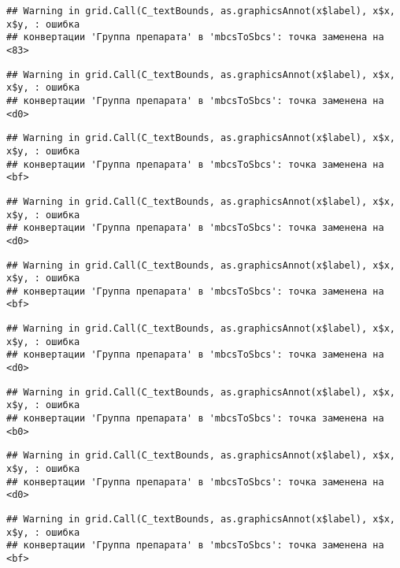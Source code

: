 \documentclass[
]{article}
\begin{document}
\begin{verbatim}
## Warning in grid.Call(C_textBounds, as.graphicsAnnot(x$label), x$x, x$y, : ошибка
## конвертации 'Группа препарата' в 'mbcsToSbcs': точка заменена на <83>
\end{verbatim}

\begin{verbatim}
## Warning in grid.Call(C_textBounds, as.graphicsAnnot(x$label), x$x, x$y, : ошибка
## конвертации 'Группа препарата' в 'mbcsToSbcs': точка заменена на <d0>
\end{verbatim}

\begin{verbatim}
## Warning in grid.Call(C_textBounds, as.graphicsAnnot(x$label), x$x, x$y, : ошибка
## конвертации 'Группа препарата' в 'mbcsToSbcs': точка заменена на <bf>
\end{verbatim}

\begin{verbatim}
## Warning in grid.Call(C_textBounds, as.graphicsAnnot(x$label), x$x, x$y, : ошибка
## конвертации 'Группа препарата' в 'mbcsToSbcs': точка заменена на <d0>
\end{verbatim}

\begin{verbatim}
## Warning in grid.Call(C_textBounds, as.graphicsAnnot(x$label), x$x, x$y, : ошибка
## конвертации 'Группа препарата' в 'mbcsToSbcs': точка заменена на <bf>
\end{verbatim}

\begin{verbatim}
## Warning in grid.Call(C_textBounds, as.graphicsAnnot(x$label), x$x, x$y, : ошибка
## конвертации 'Группа препарата' в 'mbcsToSbcs': точка заменена на <d0>
\end{verbatim}

\begin{verbatim}
## Warning in grid.Call(C_textBounds, as.graphicsAnnot(x$label), x$x, x$y, : ошибка
## конвертации 'Группа препарата' в 'mbcsToSbcs': точка заменена на <b0>
\end{verbatim}

\begin{verbatim}
## Warning in grid.Call(C_textBounds, as.graphicsAnnot(x$label), x$x, x$y, : ошибка
## конвертации 'Группа препарата' в 'mbcsToSbcs': точка заменена на <d0>
\end{verbatim}

\begin{verbatim}
## Warning in grid.Call(C_textBounds, as.graphicsAnnot(x$label), x$x, x$y, : ошибка
## конвертации 'Группа препарата' в 'mbcsToSbcs': точка заменена на <bf>
\end{verbatim}
\end{document}
